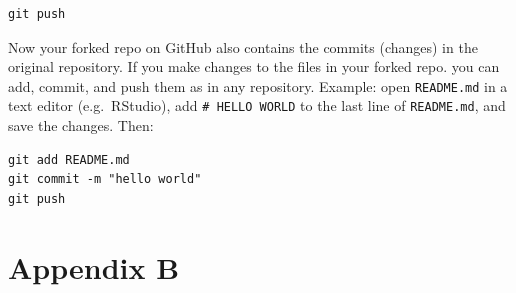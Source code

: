 \documentclass[
  12pt,
]{style/krantz}
\begin{document}
\begin{verbatim}
git push
\end{verbatim}

Now your forked repo on GitHub also contains the commits (changes) in the original repository. If you make changes to the files in your forked repo. you can add, commit, and push them as in any repository. Example: open \texttt{README.md} in a text editor (e.g.~RStudio), add \texttt{\#\ HELLO\ WORLD} to the last line of \texttt{README.md}, and save the changes. Then:

\begin{verbatim}
git add README.md
git commit -m "hello world"
git push
\end{verbatim}

\hypertarget{appendix-b}{%
\chapter{Appendix B}\label{appendix-b}}

  

\backmatter
\printindex
\end{document}
